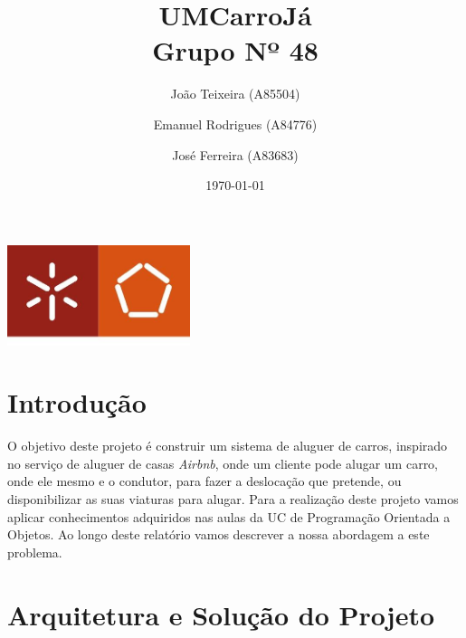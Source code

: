 \documentclass[a4paper]{report}
\begin{document}
\title{UMCarroJá\\ 
\large Grupo Nº 48}
\author{João Teixeira (A85504) \and Emanuel Rodrigues (A84776) \and José Ferreira (A83683)}
\date{\today}

\begin{center}
    \begin{minipage}{0.75\linewidth}
        \centering
        \includegraphics[width=0.4\textwidth]{eng.jpeg}\par\vspace{1cm}
        \vspace{1.5cm}
        \href{https://www.uminho.pt/PT}
        {\color{black}{\scshape\LARGE Universidade do Minho}} \par
        \vspace{1cm}
        {\color{black}{\scshape\Large Programação Orientada a Objetos}} \par
        \vspace{1.5cm}
        \maketitle
    \end{minipage}
\end{center}

\tableofcontents

\pagebreak

\chapter{Introdução}

O objetivo deste projeto é construir um sistema de aluguer de carros,
inspirado no serviço de aluguer de casas \textit{Airbnb}, onde um cliente
pode alugar um carro, onde ele mesmo e o condutor, para fazer a deslocação
que pretende, ou disponibilizar as suas viaturas para alugar.
Para a realização deste projeto vamos aplicar conhecimentos adquiridos nas
aulas da UC de Programação Orientada a Objetos.
Ao longo deste relatório vamos descrever a nossa abordagem a este problema.


\chapter{Arquitetura e Solução do Projeto}
\end{document}
